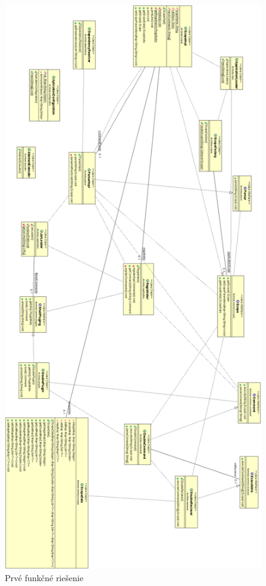  \begin{figure}[H]
	\centering
	\includegraphics[height=\textheight]{img/first_attemp_class_diag.jpg}
	\caption{Prvé funkčné riešenie}
	\label{fig:test}
\end{figure}

